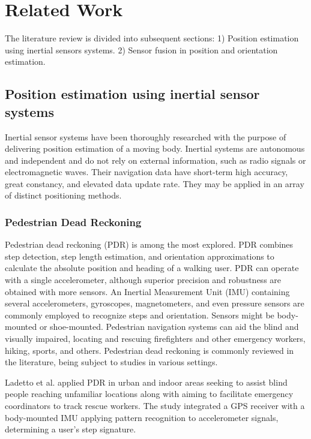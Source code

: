 \section{Related Work}
The literature review is divided into subsequent sections: 1) Position estimation using inertial sensors systems. 2) Sensor fusion in position and orientation estimation.

\subsection{Position estimation using inertial sensor systems}

Inertial sensor systems have been thoroughly researched with the purpose of delivering position estimation of a moving body. Inertial systems are autonomous and independent and do not rely on external information, such as radio signals or electromagnetic waves. Their navigation data have short-term high accuracy, great constancy, and elevated data update rate. They may be applied in an array of distinct positioning methods.

\subsubsection{Pedestrian Dead Reckoning}

Pedestrian dead reckoning (PDR) is among the most explored. PDR combines step detection, step length estimation, and orientation approximations to calculate the absolute position and heading of a walking user. PDR can operate with a single accelerometer, although superior precision and robustness are obtained with more sensors. An Inertial Measurement Unit (IMU) containing several accelerometers, gyroscopes, magnetometers, and even pressure sensors are commonly employed to recognize steps and orientation. Sensors might be body-mounted or shoe-mounted. Pedestrian navigation systems can aid the blind and visually impaired, locating and rescuing firefighters and other emergency workers, hiking, sports, and others. Pedestrian dead reckoning is commonly reviewed in the literature, being subject to studies in various settings.

Ladetto et al. \cite{ladetto2002step} applied PDR in urban and indoor areas seeking to assist blind people reaching unfamiliar locations along with aiming to facilitate emergency coordinators to track rescue workers. The study integrated a GPS receiver with a body-mounted IMU applying pattern recognition to accelerometer signals, determining a user's step signature.

